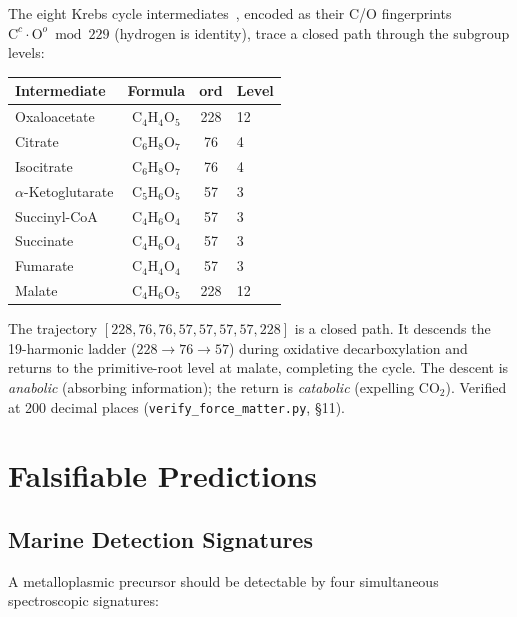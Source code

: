\begin{result}\label{res:krebs-trajectory}
The eight Krebs cycle intermediates~\cite{BurtonKrebs1953}, encoded as their C/O fingerprints $\mathrm{C}^c \cdot \mathrm{O}^o \bmod 229$ (hydrogen is identity), trace a closed path through the subgroup levels:
\begin{center}
\begin{tabular}{@{}lccl@{}}
\toprule
\textbf{Intermediate} & \textbf{Formula} & \textbf{ord} & \textbf{Level} \\
\midrule
Oxaloacetate & C$_4$H$_4$O$_5$ & 228 & 12 \\
Citrate & C$_6$H$_8$O$_7$ & 76 & 4 \\
Isocitrate & C$_6$H$_8$O$_7$ & 76 & 4 \\
$\alpha$-Ketoglutarate & C$_5$H$_6$O$_5$ & 57 & 3 \\
Succinyl-CoA & C$_4$H$_6$O$_4$ & 57 & 3 \\
Succinate & C$_4$H$_6$O$_4$ & 57 & 3 \\
Fumarate & C$_4$H$_4$O$_4$ & 57 & 3 \\
Malate & C$_4$H$_6$O$_5$ & 228 & 12 \\
\bottomrule
\end{tabular}
\end{center}
The trajectory $[228, 76, 76, 57, 57, 57, 57, 228]$ is a closed path. It descends the 19-harmonic ladder ($228 \to 76 \to 57$) during oxidative decarboxylation and returns to the primitive-root level at malate, completing the cycle. The descent is \emph{anabolic} (absorbing information); the return is \emph{catabolic} (expelling CO$_2$). Verified at 200 decimal places (\texttt{verify\_force\_matter.py}, \S 11).
\end{result}


\section{Falsifiable Predictions}\label{sec:predictions}

\subsection{Marine Detection Signatures}

A metalloplasmic precursor should be detectable by four simultaneous spectroscopic signatures:

